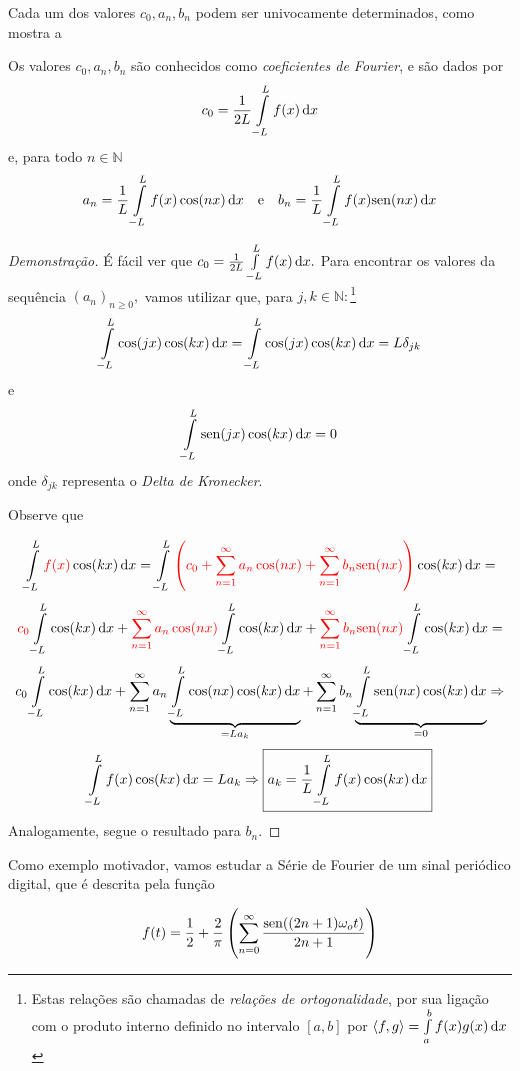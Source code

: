 \documentclass[11pt,twoside,a4paper]{book}
\begin{document}
Cada um dos valores $c_0, a_n, b_n$ podem ser univocamente determinados, como mostra a
\begin{proposicao}\label{coefi}
Os valores $c_0, a_n, b_n$ são conhecidos como \emph{coeficientes de Fourier}, e são dados por
\[
c_0 = \frac{1}{2 L} \int\limits_{-L}^L f(x) \dif {x}
\] e, para todo $n \in \mathbb{N}$
\[
a_n = \frac{1}{L} \int\limits_{- L}^L f(x) \cos(nx) \dif x \quad \mbox{e} \quad  b_n = \frac{1}{L} \int\limits_{- L}^L f(x) \sen(nx) \dif x 
\]
\end{proposicao}
\begin{proof}[Demonstração]
É fácil ver que $c_0 = \frac{1}{2 L} \int\limits_{-L}^L f(x) \dif {x}.$ Para encontrar os valores da sequência $(a_n)_{n \ge 0},$ vamos utilizar que, para $j, k \in \mathbb{N}:$\footnote{Estas relações são chamadas de \emph{relações de ortogonalidade}, por sua ligação com o produto interno definido no intervalo $[a,b]$ por $\langle f, g \rangle = \int\limits_a^b f(x) g(x) \dif x$}
\[
\int\limits_{- L}^L \cos(jx) \cos(kx) \dif x = \int\limits_{- L}^L \cos(jx) \cos(kx) \dif x = L \delta_{jk}
\]
e
\[
\int\limits_{- L}^L \sen(jx) \cos(kx) \dif x = 0
\]
onde $\delta_{jk}$ representa o \emph{Delta de Kronecker}.

Observe que

\[
\int\limits_{-L}^L \textcolor{red}{f(x)} \cos(kx) \dif x = \int\limits_{-L}^L \textcolor{red}{\left(c_0 + \sum\limits_{n = 1}^\infty a_n \cos(n x) + \sum\limits_{n = 1}^\infty b_n \sen(n  x) \right)} \cos(kx) \dif x =
\]
\[\textcolor{red}{c_0} \int\limits_{-L}^L \cos(kx) \dif x + \textcolor{red}{\sum\limits_{n = 1}^\infty a_n \cos(n  x)} \int\limits_{-L}^L \cos(kx) \dif x + \textcolor{red}{ \sum\limits_{n = 1}^\infty b_n \sen(n x)} \int\limits_{-L}^L \cos(kx) \dif x =\]
\[
c_0 \int\limits_{-L}^L \cos(kx) \dif x + \sum\limits_{n = 1}^\infty a_n \underbrace{\int\limits_{-L}^L  \cos(n  x) \cos(kx) \dif x}_{= L a_k} + \sum\limits_{n = 1}^\infty b_n  \underbrace{\int\limits_{-L}^L \sen(n  x) \cos(kx) \dif x}_{=0} \Rightarrow\]
\[\int\limits_{- L}^L f(x) \cos(kx) \dif x = L a_k \Rightarrow \boxed{a_k = \frac{1}{L} \int\limits_{-L}^L f(x) \cos(kx) \dif x }\]
Analogamente, segue o resultado para $b_n.$
\end{proof}


Como exemplo motivador, vamos estudar a Série de Fourier de um sinal periódico digital, que é descrita pela função

\begin{equation}\label{equa}
f(t) = \frac{1}{2} + \frac{2}{\pi} \left( \sum\limits_{n = 0}^\infty \frac{{\rm sen}((2n+1) \omega_o t)}{2n+1} \right)
\end{equation}
\end{document}
